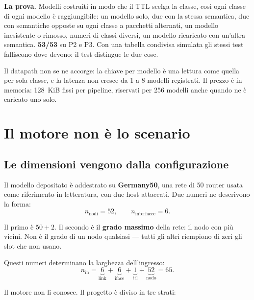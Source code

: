 \documentclass[11pt,a4paper,oneside]{report}
\begin{document}
\textbf{La prova.} Modelli costruiti in modo che il TTL scelga la classe, così
ogni classe di ogni modello è raggiungibile: un modello solo, due con la stessa
semantica, due con semantiche opposte su ogni classe a pacchetti alternati, un
modello inesistente o rimosso, numeri di classi diversi, un modello ricaricato
con un'altra semantica. \textbf{53/53} su P2 e P3. Con una tabella condivisa
simulata gli stessi test falliscono dove devono: il test distingue le due cose.

\begin{lezione}
Il datapath non se ne accorge: la chiave per modello è una lettura come quella
per sola classe, e la latenza non cresce da 1 a 8 modelli registrati. Il prezzo
è in memoria: 128~KiB fissi per pipeline, riservati per 256 modelli anche quando
ne è caricato uno solo.
\end{lezione}

\chapter{Il motore non è lo scenario}

\section{Le dimensioni vengono dalla configurazione}

Il modello depositato è addestrato su \textbf{Germany50}, una rete di 50 router
usata come riferimento in letteratura, con due host attaccati. Due numeri ne
descrivono la forma:
\[
  n_{\text{nodi}} = 52, \qquad n_{\text{interfacce}} = 6 .
\]

Il primo è $50 + 2$. Il secondo è il \textbf{grado massimo} della rete: il nodo
con più vicini. Non è il grado di un nodo qualsiasi --- tutti gli altri riempiono
di zeri gli slot che non usano.

Questi numeri determinano la larghezza dell'ingresso:
\[
  n_{\text{in}} = \underbrace{6}_{\text{link}} + \underbrace{6}_{\text{iface}}
  + \underbrace{1}_{\text{ttl}} + \underbrace{52}_{\text{nodo}} = 65 .
\]

Il motore non li conosce. Il progetto è diviso in tre strati:
\end{document}

